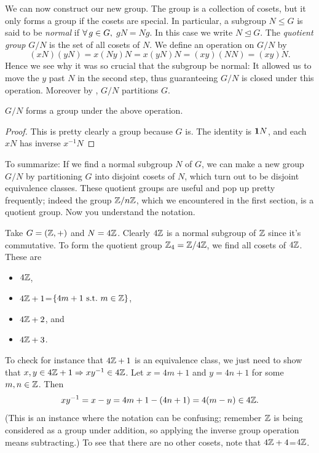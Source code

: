 We can now construct our new group. The group is a collection of cosets, but
it only forms a group if the cosets are special. In particular,
a subgroup $N\le G$ is said to be {\it normal} if 
$\operatorname{\forall} g\in G,$ $gN=Ng$. In this case we write $N\unlhd G$. The 
{\it quotient group} $G/N$ is the set of all cosets of 
$N$. We define an operation on $G/N$ by
\begin{equation}
  (xN)(yN)=x(Ny)N=x(yN)N=(xy)(NN)=(xy)N.
\end{equation}
Hence we see why it was so crucial that the subgroup be normal: It allowed
us to move the $y$ past $N$ in the second step, thus guaranteeing $G/N$ is
closed under this operation.
Moreover by , $G/N$ partitions $G$.
\begin{proposition}{}{}
  $G/N$ forms a group under the above operation.
  \begin{proof}
    This is pretty clearly a group because $G$ is. The identity is ${\mathbf 1} N$,
    and each $xN$ has inverse $x^{-1}N$
  \end{proof}
\end{proposition}
To summarize: If we find a normal subgroup $N$ of $G$, we can make a new group
$G/N$ by partitioning $G$ into disjoint cosets of $N$, which turn out to be
disjoint equivalence classes. These quotient groups are useful and pop up
pretty frequently; indeed the group $\mathbb{Z}/n\mathbb{Z}$, which we
encountered in the first section, is a quotient group. Now you understand the
notation.
\begin{example*}{}{}
  Take $G=(\mathbb{Z},+)$ and $N=4\mathbb{Z}$. Clearly $4\mathbb{Z}$ is a
  normal subgroup of $\mathbb{Z}$ since it's commutative. To form the 
  quotient group $\mathbb{Z}_4=\mathbb{Z}/4\mathbb{Z}$, we find all cosets of $4\mathbb{Z}$.
  These are
  \begin{itemize}
    \item $4\mathbb{Z}$,
    \item $4\mathbb{Z}+1$=$\{4m+1~\text{s.t.}~ m\in\mathbb{Z}\}$,
    \item $4\mathbb{Z}+2$, and
    \item $4\mathbb{Z}+3$.
  \end{itemize}
  To check for instance that $4\mathbb{Z}+1$ is an equivalence class, we just
  need to show that $x,y\in4\mathbb{Z}+1\Rightarrow xy^{-1}\in4\mathbb{Z}$.
  Let $x=4m+1$ and $y=4n+1$ for some $m,n\in\mathbb{Z}$. Then
  $$xy^{-1}=x-y=4m+1-(4n+1)=4(m-n)\in4\mathbb{Z}.$$
  (This is an instance where the notation can be confusing; remember
  $\mathbb{Z}$ is being considered as a group under addition, so applying the
  inverse group operation means subtracting.) To see that there are no other
  cosets, note that $4\mathbb{Z}+4$=$4\mathbb{Z}$.
\end{example*}

